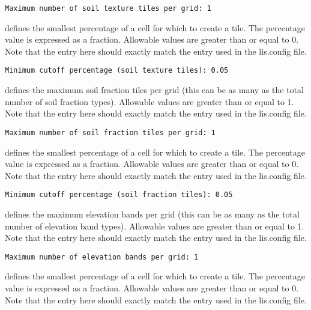  \begin{Verbatim}[frame=single]
Maximum number of soil texture tiles per grid: 1
 \end{Verbatim}

 
  defines the
 smallest percentage of a cell for which to create a tile.
 The percentage value is expressed as a fraction.
 Allowable values are greater than or equal to 0. Note that the entry
 here should exactly match the entry used in the lis.config file. 
 

 \begin{Verbatim}[frame=single]
Minimum cutoff percentage (soil texture tiles): 0.05
 \end{Verbatim}

 
  defines the
 maximum soil fraction tiles per grid (this can be as many as the total
 number of soil fraction types). 
 Allowable values are greater than or equal to 1. Note that the entry
 here should exactly match the entry used in the lis.config file. 
 

 \begin{Verbatim}[frame=single]
Maximum number of soil fraction tiles per grid: 1
 \end{Verbatim}

 
  defines the
 smallest percentage of a cell for which to create a tile.
 The percentage value is expressed as a fraction.
 Allowable values are greater than or equal to 0. Note that the entry
 here should exactly match the entry used in the lis.config file. 
 

 \begin{Verbatim}[frame=single]
Minimum cutoff percentage (soil fraction tiles): 0.05
 \end{Verbatim}

 
  defines the
 maximum elevation bands per grid (this can be as many as the total
 number of elevation band types). 
 Allowable values are greater than or equal to 1. Note that the entry
 here should exactly match the entry used in the lis.config file. 
 

 \begin{Verbatim}[frame=single]
Maximum number of elevation bands per grid: 1
 \end{Verbatim}

 
  defines the
 smallest percentage of a cell for which to create a tile.
 The percentage value is expressed as a fraction.
 Allowable values are greater than or equal to 0. Note that the entry
 here should exactly match the entry used in the lis.config file. 
 


